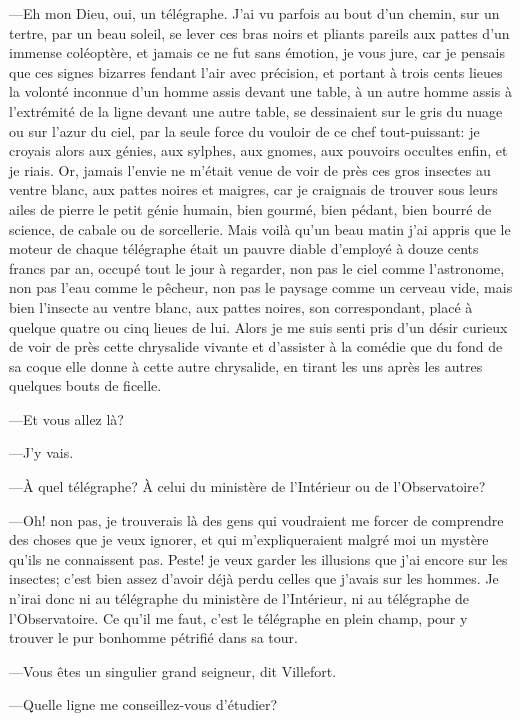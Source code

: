 —Eh mon Dieu, oui, un télégraphe. J'ai vu parfois au bout d'un chemin, sur un tertre, par un beau soleil, se lever ces bras noirs et pliants pareils aux pattes d'un immense coléoptère, et jamais ce ne fut sans émotion, je vous jure, car je pensais que ces signes bizarres fendant l'air avec précision, et portant à trois cents lieues la volonté inconnue d'un homme assis devant une table, à un autre homme assis à l'extrémité de la ligne devant une autre table, se dessinaient sur le gris du nuage ou sur l'azur du ciel, par la seule force du vouloir de ce chef tout-puissant: je croyais alors aux génies, aux sylphes, aux gnomes, aux pouvoirs occultes enfin, et je riais. Or, jamais l'envie ne m'était venue de voir de près ces gros insectes au ventre blanc, aux pattes noires et maigres, car je craignais de trouver sous leurs ailes de pierre le petit génie humain, bien gourmé, bien pédant, bien bourré de science, de cabale ou de sorcellerie. Mais voilà qu'un beau matin j'ai appris que le moteur de chaque télégraphe était un pauvre diable d'employé à douze cents francs par an, occupé tout le jour à regarder, non pas le ciel comme l'astronome, non pas l'eau comme le pêcheur, non pas le paysage comme un cerveau vide, mais bien l'insecte au ventre blanc, aux pattes noires, son correspondant, placé à quelque quatre ou cinq lieues de lui. Alors je me suis senti pris d'un désir curieux de voir de près cette chrysalide vivante et d'assister à la comédie que du fond de sa coque elle donne à cette autre chrysalide, en tirant les uns après les autres quelques bouts de ficelle. 

—Et vous allez là? 

—J'y vais. 

—À quel télégraphe? À celui du ministère de l'Intérieur ou de l'Observatoire? 

—Oh! non pas, je trouverais là des gens qui voudraient me forcer de comprendre des choses que je veux ignorer, et qui m'expliqueraient malgré moi un mystère qu'ils ne connaissent pas. Peste! je veux garder les illusions que j'ai encore sur les insectes; c'est bien assez d'avoir déjà perdu celles que j'avais sur les hommes. Je n'irai donc ni au télégraphe du ministère de l'Intérieur, ni au télégraphe de l'Observatoire. Ce qu'il me faut, c'est le télégraphe en plein champ, pour y trouver le pur bonhomme pétrifié dans sa tour. 

—Vous êtes un singulier grand seigneur, dit Villefort. 

—Quelle ligne me conseillez-vous d'étudier? 

